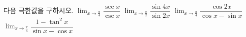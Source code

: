 다음 극한값을 구하시오.
 $\displaystyle\lim_{x\to\frac{\pi}{4}}\dfrac{\sec x}{\csc x}$
 $\displaystyle\lim_{x\to\frac{\pi}{2}}\dfrac{\sin 4x}{\sin 2x}$
 $\displaystyle\lim_{x\to\frac{\pi}{4}}\dfrac{\cos 2x}{\cos x-\sin x}$
 $\displaystyle\lim_{x\to\frac{\pi}{4}}\dfrac{1-\tan^2 x}{\sin x-\cos x}$
